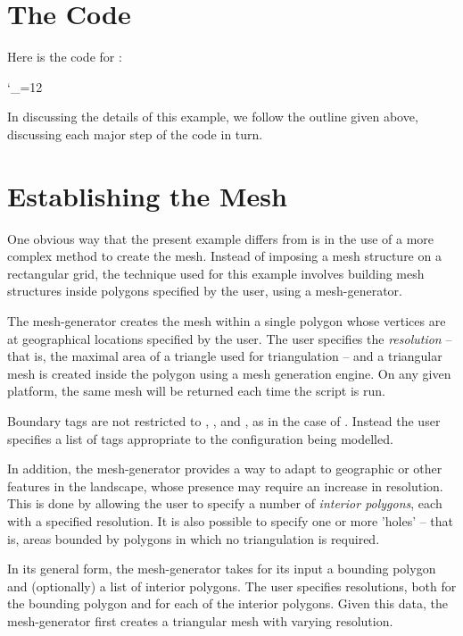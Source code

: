 \documentclass{manual}
\newcommand{\verbatiminputB}[1]{%
\endgroup}
\def\verbatiminputunderscore{\begingroup
\catcode`\_=12
\verbatiminputB}
\begin{document}
\section{The Code}

Here is the code for :

\verbatiminputunderscore{../../anuga_core/examples/cairns/runcairns.py}

In discussing the details of this example, we follow the outline
given above, discussing each major step of the code in turn.

\section{Establishing the Mesh}

One obvious way that the present example differs from
 is in the use of a more complex method to
create the mesh. Instead of imposing a mesh structure on a
rectangular grid, the technique used for this example involves
building mesh structures inside polygons specified by the user,
using a mesh-generator.

The mesh-generator creates the mesh within a single
polygon whose vertices are at geographical locations specified by
the user. The user specifies the \emph{resolution} -- that is, the
maximal area of a triangle used for triangulation -- and a triangular
mesh is created inside the polygon using a mesh generation engine.
On any given platform, the same mesh will be returned each time the
script is run.

Boundary tags are not restricted to , ,
 and , as in the case of
. Instead the user specifies a list of
tags appropriate to the configuration being modelled.

In addition, the mesh-generator provides a way to adapt to geographic or
other features in the landscape, whose presence may require an
increase in resolution. This is done by allowing the user to specify
a number of \emph{interior polygons}, each with a specified
resolution. It is also
possible to specify one or more 'holes' -- that is, areas bounded by
polygons in which no triangulation is required.

In its general form, the mesh-generator takes for its input a bounding
polygon and (optionally) a list of interior polygons. The user
specifies resolutions, both for the bounding polygon and for each of
the interior polygons. Given this data, the mesh-generator first creates a
triangular mesh with varying resolution.
\end{document}

